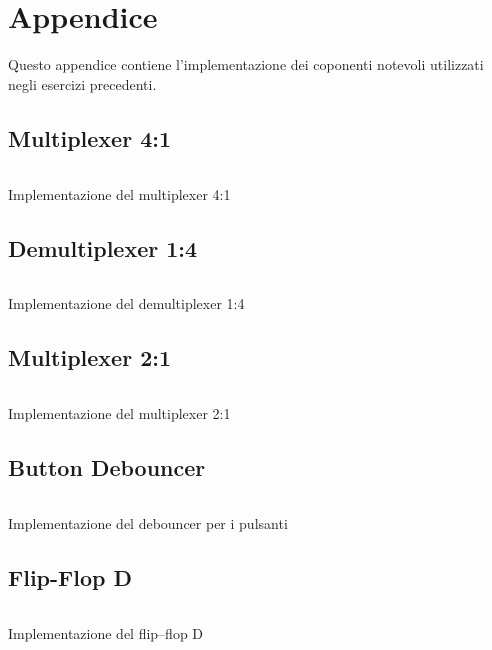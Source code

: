 \section{Appendice}
Questo appendice contiene l'implementazione dei coponenti notevoli utilizzati negli esercizi precedenti.

\subsection*{Multiplexer 4:1}
\begin{code}
    \inputminted{vhdl}{vhdl/mux4_1.vhd}
    \caption{Implementazione del multiplexer 4:1}
    \label{cod:mux_4_1}
\end{code}

\subsection*{Demultiplexer 1:4}
\begin{code}
    \inputminted{vhdl}{vhdl/dmux1_4.vhd}
    \caption{Implementazione del demultiplexer 1:4}
    \label{cod:dmux_1_4}
\end{code}

\subsection*{Multiplexer 2:1}
\begin{code}
    \inputminted{vhdl}{vhdl/mux_2_1.vhd}
    \caption{Implementazione del multiplexer 2:1}
    \label{cod:mux_2_1}
\end{code}

\subsection*{Button Debouncer}
\begin{code}
    \inputminted{vhdl}{vhdl/Button_Debouncer.vhd}
    \caption{Implementazione del debouncer per i pulsanti}
    \label{cod:button_debouncer}
\end{code}

\subsection*{Flip-Flop D}
\begin{code}
    \inputminted{vhdl}{vhdl/flipflop_D.vhd}
    \caption{Implementazione del flip--flop D}
    \label{cod:flipflop_D}
\end{code}

